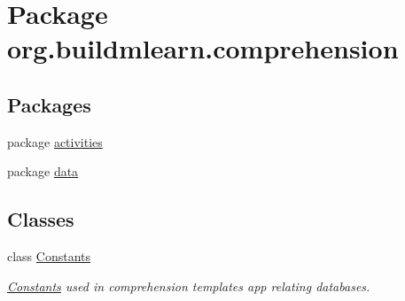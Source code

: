 \hypertarget{namespaceorg_1_1buildmlearn_1_1comprehension}{}\section{Package org.\+buildmlearn.\+comprehension}
\label{namespaceorg_1_1buildmlearn_1_1comprehension}
\subsection*{Packages}
\begin{DoxyCompactItemize}
\item 
package \hyperlink{namespaceorg_1_1buildmlearn_1_1comprehension_1_1activities}{activities}
\item 
package \hyperlink{namespaceorg_1_1buildmlearn_1_1comprehension_1_1data}{data}
\end{DoxyCompactItemize}
\subsection*{Classes}
\begin{DoxyCompactItemize}
\item 
class \hyperlink{classorg_1_1buildmlearn_1_1comprehension_1_1Constants}{Constants}
\begin{DoxyCompactList}\small\item\em \hyperlink{classorg_1_1buildmlearn_1_1comprehension_1_1Constants}{Constants} used in comprehension template\textquotesingle{}s app relating databases. \end{DoxyCompactList}\end{DoxyCompactItemize}
